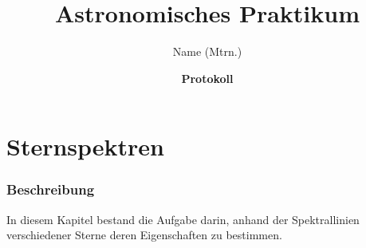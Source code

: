 \documentclass[12pt]{article}
\begin{document}
\pagestyle{fancy}
%
\title{\huge{\textbf{Astronomisches Praktikum}}}%
\author{Name (Mtrn.)}
\date{\large{\textbf{Protokoll}}}%
%
\maketitle
\thispagestyle{empty}
\tableofcontents
%
\newpage
\section{Sternspektren}
\subsubsection*{Beschreibung}
In diesem Kapitel bestand die Aufgabe darin, anhand der Spektrallinien verschiedener Sterne deren Eigenschaften zu bestimmen.
\end{document}
